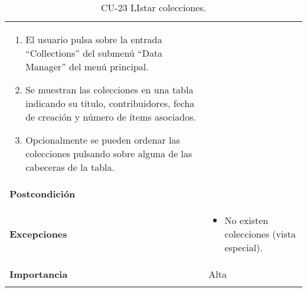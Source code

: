 \begin{longtable}[]{@{}ll@{}}
\begin{minipage}[t]{0.78\columnwidth}
\begin{enumerate}
\def\labelenumi{\arabic{enumi}.}
\tightlist
\item
  El usuario pulsa sobre la entrada ``Collections'' del submenú ``Data
  Manager'' del menú principal.
\item
  Se muestran las colecciones en una tabla indicando su título,
  contribuidores, fecha de creación y número de ítems asociados.
\item
  Opcionalmente se pueden ordenar las colecciones pulsando sobre alguna
  de las cabeceras de la tabla.
\end{enumerate}\strut
\end{minipage}\tabularnewline
\begin{minipage}[t]{0.16\columnwidth}\raggedright
\textbf{Postcondición}\strut
\end{minipage} & \begin{minipage}[t]{0.78\columnwidth}\raggedright
\strut
\end{minipage}\tabularnewline
\begin{minipage}[t]{0.16\columnwidth}\raggedright
\textbf{Excepciones}\strut
\end{minipage} & \begin{minipage}[t]{0.78\columnwidth}\raggedright
\begin{itemize}
\tightlist
\item
  No existen colecciones (vista especial).
\end{itemize}\strut
\end{minipage}\tabularnewline
\begin{minipage}[t]{0.16\columnwidth}\raggedright
\textbf{Importancia}\strut
\end{minipage} & \begin{minipage}[t]{0.78\columnwidth}\raggedright
Alta\strut
\end{minipage}\tabularnewline
\bottomrule
\caption{CU-23 LIstar colecciones.}
\end{longtable}

